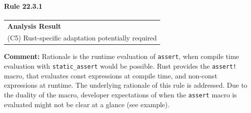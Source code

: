 \paragraph{Rule 22.3.1}
\begin{longtable}{p{13cm}}
\textbf{Analysis Result} \\
(C5) Rust-specific adaptation potentially required \\
\end{longtable}
\textbf{Comment:} Rationale is the runtime evaluation of \texttt{assert}, when compile time evaluation with \texttt{static\_assert} would be possible. Rust provides the \texttt{assert!} macro, that evaluates const expressions at compile time, and non-const expressions at runtime. The underlying rationale of this rule is addressed. Due to the duality of the macro, developer expectations of when the \texttt{assert} macro is evaluated might not be clear at a glance (see example). \\



